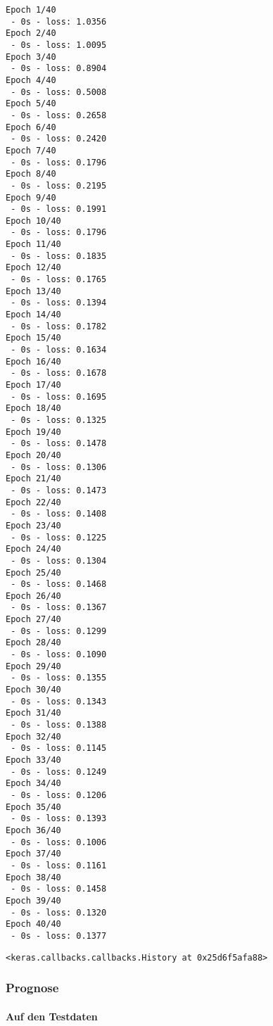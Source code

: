 \documentclass[paper=landscape]{scrartcl}
\makeatletter
\newcommand{\boxspacing}{\kern\kvtcb@left@rule\kern\kvtcb@boxsep}
\newcommand{\prompt}[4]{
        \ttfamily\llap{{\color{#2}[#3]:\hspace{3pt}#4}}\vspace{-\baselineskip}
    }
\makeatother
\begin{document}
    \begin{Verbatim}[commandchars=\\\{\}]
Epoch 1/40
 - 0s - loss: 1.0356
Epoch 2/40
 - 0s - loss: 1.0095
Epoch 3/40
 - 0s - loss: 0.8904
Epoch 4/40
 - 0s - loss: 0.5008
Epoch 5/40
 - 0s - loss: 0.2658
Epoch 6/40
 - 0s - loss: 0.2420
Epoch 7/40
 - 0s - loss: 0.1796
Epoch 8/40
 - 0s - loss: 0.2195
Epoch 9/40
 - 0s - loss: 0.1991
Epoch 10/40
 - 0s - loss: 0.1796
Epoch 11/40
 - 0s - loss: 0.1835
Epoch 12/40
 - 0s - loss: 0.1765
Epoch 13/40
 - 0s - loss: 0.1394
Epoch 14/40
 - 0s - loss: 0.1782
Epoch 15/40
 - 0s - loss: 0.1634
Epoch 16/40
 - 0s - loss: 0.1678
Epoch 17/40
 - 0s - loss: 0.1695
Epoch 18/40
 - 0s - loss: 0.1325
Epoch 19/40
 - 0s - loss: 0.1478
Epoch 20/40
 - 0s - loss: 0.1306
Epoch 21/40
 - 0s - loss: 0.1473
Epoch 22/40
 - 0s - loss: 0.1408
Epoch 23/40
 - 0s - loss: 0.1225
Epoch 24/40
 - 0s - loss: 0.1304
Epoch 25/40
 - 0s - loss: 0.1468
Epoch 26/40
 - 0s - loss: 0.1367
Epoch 27/40
 - 0s - loss: 0.1299
Epoch 28/40
 - 0s - loss: 0.1090
Epoch 29/40
 - 0s - loss: 0.1355
Epoch 30/40
 - 0s - loss: 0.1343
Epoch 31/40
 - 0s - loss: 0.1388
Epoch 32/40
 - 0s - loss: 0.1145
Epoch 33/40
 - 0s - loss: 0.1249
Epoch 34/40
 - 0s - loss: 0.1206
Epoch 35/40
 - 0s - loss: 0.1393
Epoch 36/40
 - 0s - loss: 0.1006
Epoch 37/40
 - 0s - loss: 0.1161
Epoch 38/40
 - 0s - loss: 0.1458
Epoch 39/40
 - 0s - loss: 0.1320
Epoch 40/40
 - 0s - loss: 0.1377
    \end{Verbatim}

            \begin{tcolorbox}[breakable, size=fbox, boxrule=.5pt, pad at break*=1mm, opacityfill=0]
\prompt{Out}{outcolor}{29}{\boxspacing}
\begin{Verbatim}[commandchars=\\\{\}]
<keras.callbacks.callbacks.History at 0x25d6f5afa88>
\end{Verbatim}
\end{tcolorbox}
        
    \hypertarget{prognose}{%
\subsubsection{Prognose}\label{prognose}}

\hypertarget{auf-den-testdaten}{%
\paragraph{Auf den Testdaten}\label{auf-den-testdaten}}
\end{document}
